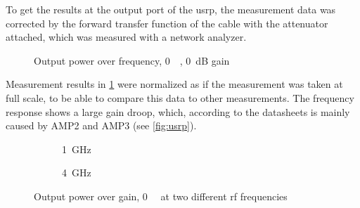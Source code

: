 \documentclass[12pt,a4paper,parskip=full,abstracton]{scrartcl}
\begin{document}
To get the results at the output port of the \gls{usrp}, the measurement data was corrected
by the forward transfer function of the cable with the attenuator attached, which was measured
with a network analyzer.

\begin{figure}[htb]
    \centering
{}
\caption{Output power over frequency, \SI{0}{\deci\belfs}, \SI{0}{\deci\bel} gain}
    \label{fig:outputrf08}
\end{figure}

Measurement results in \cref{fig:outputrf08} were normalized as if the measurement
was taken at full scale, to be able to compare this data to other measurements.
The frequency response shows a large gain droop, which, according to the datasheets
is mainly caused by AMP2\cite{amp2} and AMP3\cite{amp3} (see \cref{fig:usrp}).

\begin{figure}[htb]
    \begin{subfigure}[t]{.5\linewidth}
        \centering
{}
    \caption{\SI{1}{\giga\hertz}}
    \label{fig:outputrf1}
    \end{subfigure}
    \begin{subfigure}[t]{.5\linewidth}
        \centering
{}
    \caption{\SI{4}{\giga\hertz}}
    \label{fig:outputrf4}
    \end{subfigure}
    \caption{Output power over gain, \SI{0}{\deci\belfs} at two different \gls{rf} frequencies}
\end{figure}
\end{document}
